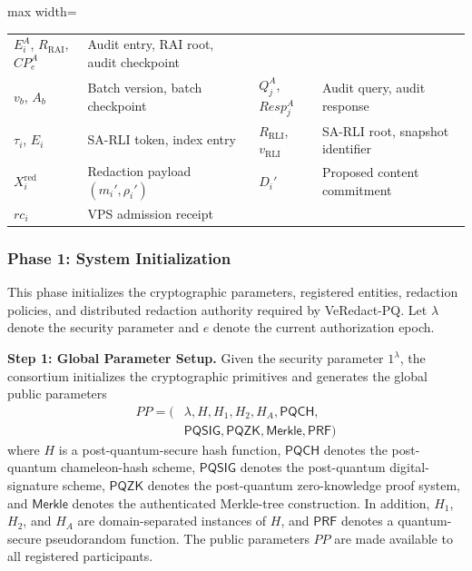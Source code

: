\documentclass[lettersize,journal]{IEEEtran}
\begin{document}
\begin{table}[t]
\begin{adjustbox}{max width=\textwidth}
\begin{tabular}{@{}ll@{\quad}ll@{}}
    $E_i^A$, $R_{\mathrm{RAI}}$, $CP_e^A$ & Audit entry, RAI root, audit checkpoint\\
    $v_b$, $A_b$ & Batch version, batch checkpoint &
    $Q_j^A$, $Resp_j^A$ & Audit query, audit response\\
    $\tau_i$, $E_i$ & SA-RLI token, index entry &
    $R_{\mathrm{RLI}}$, $v_{\mathrm{RLI}}$ & SA-RLI root, snapshot identifier\\
    $X_i^{\mathrm{red}}$ & Redaction payload $(m_i',\rho_i')$ &
    $D_i'$ & Proposed content commitment\\
    {$rc_i$} & {VPS admission receipt} & & \\
    \hline
    \end{tabular}
    \end{adjustbox}
    \end{table}
    
    \subsubsection*{\textbf{Phase 1: System Initialization}}
    
    This phase initializes the cryptographic parameters, registered
    entities, redaction policies, and distributed redaction authority
    required by VeRedact-PQ. Let $\lambda$ denote the security parameter
    and $e$ denote the current authorization epoch.
    
    \textbf{Step 1: Global Parameter Setup.}
    Given the security parameter $1^\lambda$, the consortium initializes
    the cryptographic primitives and generates the global public
    parameters
    \begin{equation}
    \begin{aligned}
    PP=(&\lambda,H,H_1,H_2,H_A,\mathsf{PQCH},\\
    &\mathsf{PQSIG},\mathsf{PQZK},\mathsf{Merkle},\mathsf{PRF})
    \end{aligned}
    \end{equation}
    where $H$ is a post-quantum-secure hash function,
    $\mathsf{PQCH}$ denotes the post-quantum chameleon-hash scheme,
    $\mathsf{PQSIG}$ denotes the post-quantum digital-signature scheme,
     { $\mathsf{PQZK}$} denotes the  {post-quantum} zero-knowledge proof system, and
    $\mathsf{Merkle}$ denotes the authenticated Merkle-tree construction.
     {In addition, $H_1$, $H_2$, and $H_A$ are domain-separated
    instances of $H$, and $\mathsf{PRF}$ denotes a quantum-secure
    pseudorandom function.}
    The public parameters $PP$ are made available to all registered
    participants.
    
\end{document}
